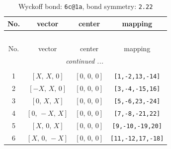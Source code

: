 \documentclass[fleqn,8pt]{jsarticle}
\begin{document}
\renewcommand{\arraystretch}{1.2}
\begin{longtable}{cccc}
\caption{Wyckoff bond: {\tt 6c@1a}, bond symmetry: {\tt 2.22}}
 \\
 \hline \hline
No. & vector & center & mapping \\ \hline \endfirsthead

\multicolumn{3}{l}{\tablename\ \thetable{}} \\
 \hline \hline
No. & vector & center & mapping \\ \hline \endhead

 \hline \hline
\multicolumn{3}{r}{\footnotesize\it continued ...} \\ \endfoot

 \hline \hline
\multicolumn{3}{r}{} \\ \endlastfoot

1 & $\left[ X,\, X,\, 0 \right]$ & $\left[ 0,\, 0,\, 0 \right]$ & {\tt [1,-2,13,-14]} \\ \hline
2 & $\left[ - X,\, X,\, 0 \right]$ & $\left[ 0,\, 0,\, 0 \right]$ & {\tt [3,-4,-15,16]} \\ \hline
3 & $\left[ 0,\, X,\, X \right]$ & $\left[ 0,\, 0,\, 0 \right]$ & {\tt [5,-6,23,-24]} \\ \hline
4 & $\left[ 0,\, - X,\, X \right]$ & $\left[ 0,\, 0,\, 0 \right]$ & {\tt [7,-8,-21,22]} \\ \hline
5 & $\left[ X,\, 0,\, X \right]$ & $\left[ 0,\, 0,\, 0 \right]$ & {\tt [9,-10,-19,20]} \\ \hline
6 & $\left[ X,\, 0,\, - X \right]$ & $\left[ 0,\, 0,\, 0 \right]$ & {\tt [11,-12,17,-18]} \\
\end{longtable}
\renewcommand{\arraystretch}{1.2}
\end{document}
